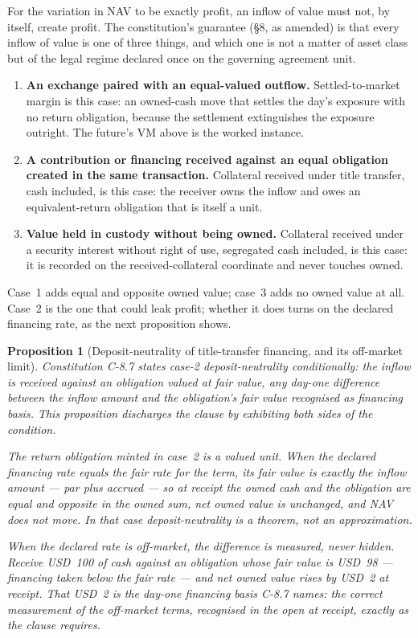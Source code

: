 \documentclass[11pt,a4paper]{article}
\newcommand{\USD}[1]{\mbox{USD~#1}}
\newtheorem{proposition}[definition]{Proposition}
\begin{document}
For the variation in NAV to be exactly profit, an inflow of value must not, by
itself, create profit. The constitution's guarantee (§8, as amended) is that
every inflow of value is one of three things, and which one is not a matter of
asset class but of the legal regime declared once on the governing agreement
unit.

\begin{enumerate}[label=(\arabic*),leftmargin=*]
\item \textbf{An exchange paired with an equal-valued outflow.}
  Settled-to-market margin is this case: an owned-cash move that settles the
  day's exposure with no return obligation, because the settlement
  extinguishes the exposure outright. The future's VM above is the worked
  instance.
\item \textbf{A contribution or financing received against an equal obligation
  created in the same transaction.} Collateral received under title transfer,
  cash included, is this case: the receiver owns the inflow and owes an
  equivalent-return obligation that is itself a unit.
\item \textbf{Value held in custody without being owned.} Collateral received
  under a security interest without right of use, segregated cash included, is
  this case: it is recorded on the received-collateral coordinate and never
  touches owned.
\end{enumerate}

Case~1 adds equal and opposite owned value; case~3 adds no owned value at all.
Case~2 is the one that could leak profit; whether it does turns on the declared
financing rate, as the next proposition shows.

\begin{proposition}[Deposit-neutrality of title-transfer financing, and its off-market limit]
Constitution C-8.7 states case-2 deposit-neutrality conditionally: the inflow is
received against an obligation \emph{valued at fair value}, any day-one difference
between the inflow amount and the obligation's fair value recognised as financing
basis. This proposition discharges the clause by exhibiting both sides of the
condition.

The return obligation minted in case~2 is a valued unit. When the declared
financing rate equals the fair rate for the term, its fair value is exactly the
inflow amount --- par plus accrued --- so at receipt the owned cash and the
obligation are equal and opposite in the owned sum, net owned value is unchanged,
and NAV does not move. In that case deposit-neutrality is a theorem, not an
approximation.

When the declared rate is off-market, the difference is measured, never hidden.
Receive \USD{100} of cash against an obligation whose fair value is \USD{98} ---
financing taken below the fair rate --- and net owned value rises by \USD{2} at
receipt. That \USD{2} is the day-one \emph{financing basis} C-8.7 names: the
correct measurement of the off-market terms, recognised in the open at receipt,
exactly as the clause requires.
\end{proposition}
\end{document}

